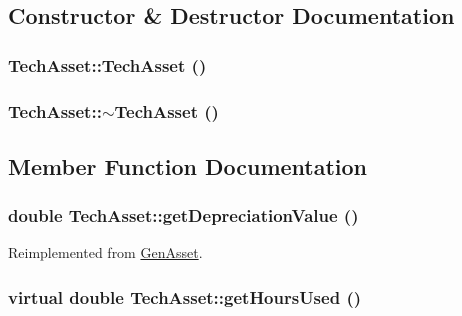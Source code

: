 \subsection{Constructor \& Destructor Documentation}
\hypertarget{class_tech_asset_a277fa3ff667feeaa41375ad0bedb37b1}{
\subsubsection[{TechAsset}]{\setlength{\rightskip}{0pt plus 5cm}TechAsset::TechAsset ()}}
\label{class_tech_asset_a277fa3ff667feeaa41375ad0bedb37b1}
\hypertarget{class_tech_asset_adc6ae9ac2d36b7e37ade4c4035f9a595}{
\subsubsection[{$\sim$TechAsset}]{\setlength{\rightskip}{0pt plus 5cm}TechAsset::$\sim$TechAsset ()}}
\label{class_tech_asset_adc6ae9ac2d36b7e37ade4c4035f9a595}


\subsection{Member Function Documentation}
\hypertarget{class_tech_asset_ac855fd27bd197ef63d91588fcd7416c5}{
\subsubsection[{getDepreciationValue}]{\setlength{\rightskip}{0pt plus 5cm}double TechAsset::getDepreciationValue ()}}
\label{class_tech_asset_ac855fd27bd197ef63d91588fcd7416c5}


Reimplemented from \hyperlink{class_gen_asset_abb1f15e982bee528c0be96e78764ec6b}{GenAsset}.\hypertarget{class_tech_asset_af2cd10df95cbd8d5095098e0c6c16722}{
\subsubsection[{getHoursUsed}]{\setlength{\rightskip}{0pt plus 5cm}virtual double TechAsset::getHoursUsed ()}}
\label{class_tech_asset_af2cd10df95cbd8d5095098e0c6c16722}


